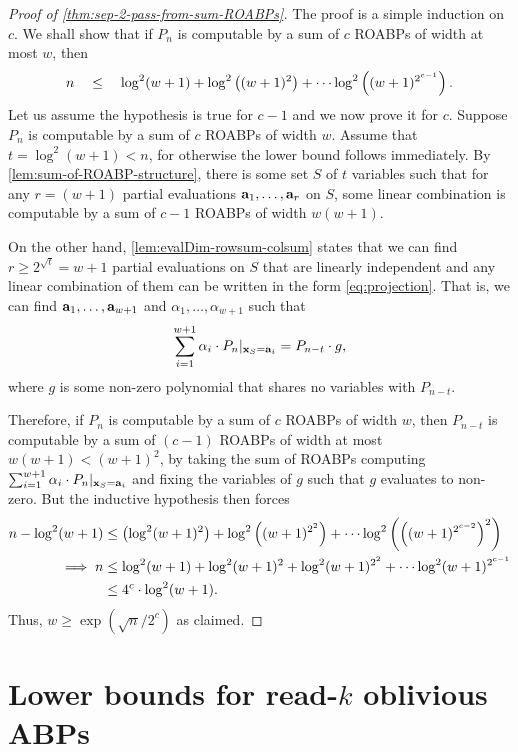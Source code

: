 \documentclass[11pt]{article}
\begin{document}
\begin{proof}[Proof of \autoref{thm:sep-2-pass-from-sum-ROABPs}]
  The proof is a simple induction on $c$. We shall show that if $P_n$ is computable by a sum of $c$ ROABPs of width at most $w$, then
  \[
  n \quad \leq \quad \log^2(w+1) + \log^2\left( (w+1)^2 \right) + \cdots \log^2 \left( (w+1)^{2^{c-1}} \right). 
  \]
  Let us assume the hypothesis is true for $c-1$ and we now prove it for $c$. Suppose $P_n$ is computable by a sum of $c$ ROABPs of width $w$. Assume that $t = \log^2(w+1) < n$, for otherwise the lower bound follows immediately. By \autoref{lem:sum-of-ROABP-structure}, there is some set $S$ of $t$ variables such that for any $r = (w+1)$ partial evaluations $\mathbf{a}_1,\ldots, \mathbf{a}_r$ on $S$, some linear combination is computable by a sum of $c-1$ ROABPs of width $w(w+1)$.

On the other hand, \autoref{lem:evalDim-rowsum-colsum} states that we can find $r\geq 2^{\sqrt{t}} =w+1$ partial evaluations on $S$ that are linearly independent and any linear combination of them can be written in the form \eqref{eq:projection}. That is, we can find $\mathbf{a}_1, \ldots, \mathbf{a}_{w+1}$ and $\alpha_1, \ldots, \alpha_{w+1}$ such that
\[
\sum_{i=1}^{w+1} \alpha_i \cdot P_n |_{\mathbf{x}_S = \mathbf{a}_i} = P_{n-t} \cdot g,
\]
where $g$ is some non-zero polynomial that shares no variables with $P_{n-t}$.

Therefore, if $P_n$ is computable by a sum of $c$ ROABPs of width $w$, then $P_{n- t}$ is computable by a sum of $(c-1)$ ROABPs of width at most $w(w+1) < (w+1)^2$, by taking the sum of ROABPs computing $\sum_{i=1}^{w+1} \alpha_i \cdot P_n |_{\mathbf{x}_S = \mathbf{a}_i}$ and fixing the variables of $g$ such that $g$ evaluates to non-zero. But the inductive hypothesis then forces
\begin{align*}
n - \log^2(w+1) & \leq \left( \log^2(w+1)^2 \right) + \log^2\left( (w+1)^{2^2} \right) + \cdots \log^2 \left( {\left( (w+1)^{2^{c-2}} \right)}^2 \right)\\
\implies n  & \leq  \log^2(w+1) + \log^2(w+1)^2 + \log^2(w+1)^{2^2} + \cdots \log^2 (w+1)^{2^{c-1}}\\
 & \leq  4^c \cdot \log^2 (w+1).
\end{align*}
Thus, $w \geq \exp(\sqrt{n}/2^c)$ as claimed. 
\end{proof}



\section{Lower bounds for read-$k$ oblivious ABPs}
\end{document}
